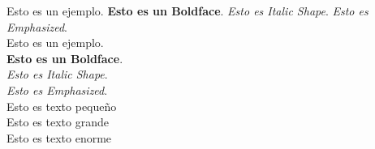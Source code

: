\documentclass{article}
\begin{document}
Esto es un ejemplo. 
\textbf{Esto es un Boldface}. 
\textit{Esto es Italic Shape}. 
\emph{Esto es Emphasized}. \\

Esto es un ejemplo. \\
\textbf{Esto es un Boldface}. \\
\textit{Esto es Italic Shape}. \\
\emph{Esto es Emphasized}. \\

\small Esto es texto pequeño \\
\large Esto es texto grande \\
\huge  Esto es texto enorme \\
\end{document}
